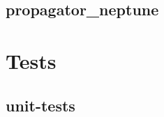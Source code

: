 \documentclass[letterpaper,10pt,english]{sphinxmanual}
\begin{document}
\subsection{propagator\_neptune}
\label{\detokenize{modules/propagator_neptune:propagator-neptune}}\label{\detokenize{modules/propagator_neptune::doc}}

\section{Tests}
\label{\detokenize{modules/doc:tests}}

\subsection{unit-tests}
\label{\detokenize{modules/tests:unit-tests}}\label{\detokenize{modules/tests::doc}}
\end{document}
